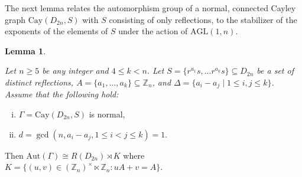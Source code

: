 \documentclass[12pt,reqno,a4paper]{amsart}
\theoremstyle{definition}
\newtheorem{lem}[defn]{Lemma}
\begin{document}
The next lemma relates the automorphism group of a normal, connected Cayley graph
$\mathrm{Cay}(D_{2n},S)$ with $S$ consisting of only reflections,
to the stabilizer of the exponents of the elements of $S$ under the action of $\mathrm{AGL}(1,n)$.

\begin{lem}\label{Lemma 4.6}
{\em Let $n \ge 5$ be any integer and $4\leq k<n$. 
Let $S = \{r^{a_{1}}s,... r^{a_{k}}s\} \subseteq D_{2n}$
be a set of distinct reflections, 
$A = \{a_{1}, ..., a_{k}\} \subseteq \mathbb{Z}_{n}$, and 
$\Delta = \{a_{i} - a_{j} \mid 1 \le i,j \le k\}$.
Assume that the following hold:
\begin{enumerate}[(i)]
    \item \(\Gamma = \mathrm{Cay}(D_{2n}, S)\) is normal,
    \item $d=\gcd(n,a_i-a_j, 1\leq i<j\leq k)=1$.
\end{enumerate}
Then
$
\mathrm{Aut}(\Gamma)
\cong R(D_{2n}) \rtimes K$ where $K=
\bigl\{(u,v) \in (\mathbb{Z}_{n})^{\times} \ltimes \mathbb{Z}_{n}: uA + v = A\bigr\}
$.
}
\end{lem}
\end{document}
